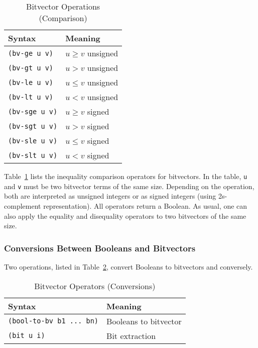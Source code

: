 \documentclass[11pt,twoside,fleqn,openright,titlepage]{cslreport}
\begin{document}
\begin{table}
\begin{small}
\begin{center}
\begin{tabular}{|p{3cm}|l|}
\hline
Syntax & Meaning \\
\hline
\texttt{(bv-ge u v)} & $u \geq v$ unsigned\\
\texttt{(bv-gt u v)} & $u > v$ unsigned \\
\texttt{(bv-le u v)} & $u \leq v$ unsigned \\
\texttt{(bv-lt u v)} & $u < v$ unsigned \\
\hline
\texttt{(bv-sge u v)} & $u \geq v$ signed\\
\texttt{(bv-sgt u v)} & $u > v$ signed \\
\texttt{(bv-sle u v)} & $u \leq v$ signed \\
\texttt{(bv-slt u v)} & $u < v$ signed \\
\hline
\end{tabular}
\end{center}
\end{small}
\caption{Bitvector Operations (Comparison)}
\label{bitvectors5}
\end{table}

Table~\ref{bitvectors5} lists the inequality comparison operators for
bitvectors. In the table, \texttt{u} and \texttt{v} must be two
bitvector terms of the same size. Depending on the operation, both are
interpreted as unsigned integers or as signed integers (using
2s-complement representation).  All operators return a Boolean. As
usual, one can also apply the equality and disequality operators to
two bitvectors of the same size.


\subsubsection*{Conversions Between Booleans and Bitvectors}

Two operations, listed in Table~\ref{bitvectors6},  convert Booleans
to bitvectors and conversely.

\begin{table}[h]
\begin{small}
\begin{center}
\begin{tabular}{|p{5cm}|l|}
\hline
Syntax & Meaning \\
\hline
\texttt{(bool-to-bv b1 ... bn)} & Booleans to bitvector \\
\texttt{(bit u i)} & Bit extraction\\
\hline
\end{tabular}
\end{center}
\end{small}
\caption{Bitvector Operators (Conversions)}
\label{bitvectors6}
\end{table}
\end{document}

